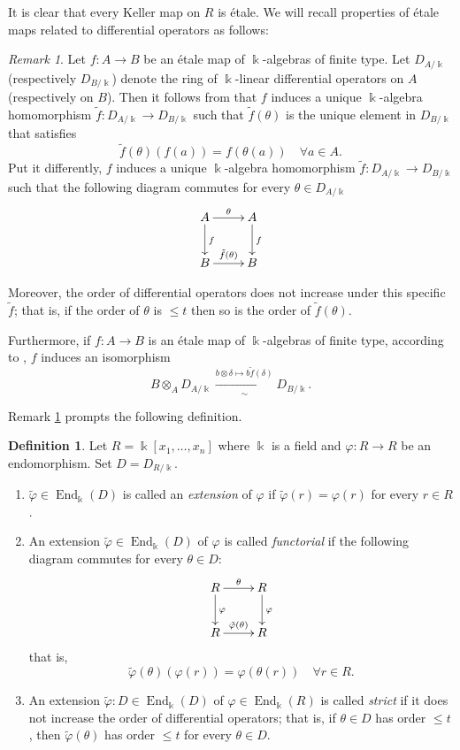 \documentclass[11pt]{amsart}
\theoremstyle{definition}
\newtheorem{definition}[theorem]{Definition}
\theoremstyle{remark}
\newtheorem{remark}[theorem]{Remark}
\numberwithin{equation}{subsection}
\DeclareMathOperator{\kk}{\Bbbk}
\DeclareMathOperator{\End}{End}
\begin{document}
It is clear that every Keller map on $R$ is \'{e}tale. We will recall  properties of \'{e}tale maps related to differential operators as follows:
\begin{remark}
\label{Masson theorem}
Let $f:A\to B$ be an \'{e}tale map of $\kk$-algebras of finite type. Let $D_{A/\kk}$ (respectively $D_{B/\kk}$) denote the ring of $\kk$-linear differential operators on $A$ (respectively on $B$). Then it follows from \cite[Theorem 2.2.5]{MassonThesis} that $f$ induces a unique $\kk$-algebra homomorphism $\tilde{f}:D_{A/\kk}\to D_{B/\kk}$ such that $\tilde{f}(\theta)$ is the unique element in $D_{B/\kk}$ that satisfies 
\[\tilde{f}(\theta)(f(a))=f(\theta(a))\quad\forall a\in A.\]
Put it differently, $f$ induces a unique $\kk$-algebra homomorphism $\tilde{f}:D_{A/\kk}\to D_{B/\kk}$ such that the following diagram commutes for every $\theta\in D_{A/\kk}$
\[
\xymatrix{
A \ar[r]^{\theta} \ar[d]^{f} & A \ar[d]^{f}\\
B\ar[r]^{\tilde{f}(\theta)} & B
}
\]
  
Moreover, the order of differential operators does not increase under this specific $\tilde{f}$; that is, if the order of $\theta$ is $\leq t$ then so is the order of $\tilde{f}(\theta)$.

Furthermore, if $f:A\to B$ is an \'{e}tale map of $\kk$-algebras of finite type, according to \cite[Theorem 2.2.10]{MassonThesis}, $f$ induces an isomorphism
\[B\otimes_AD_{A/\kk}\xrightarrow[\sim]{b\otimes \delta\mapsto b\tilde{f}(\delta)}D_{B/\kk}.\]
\end{remark}

Remark \ref{Masson theorem} prompts the following definition.
\begin{definition}
Let $R=\kk[x_1,\dots,x_n]$ where $\kk$ is a field and $\varphi:R\to R$ be an endomorphism. Set $D=D_{R/\kk}$.
\begin{enumerate}


\item $\tilde{\varphi}\in \End_{\kk}(D)$ is called an \emph{extension} of $\varphi$ if $\tilde{\varphi}(r)=\varphi(r)$ for every $r\in R$.

\item An extension $\tilde{\varphi}\in \End_{\kk}(D)$ of $\varphi$ is called \emph{functorial} if the following diagram commutes for every $\theta\in D$:
\[
\xymatrix{
R \ar[r]^{\theta} \ar[d]^{\varphi} & R \ar[d]^{\varphi}\\
R\ar[r]^{\tilde{\varphi}(\theta)} & R
}
\]
that is, 
\[\tilde{\varphi}(\theta)(\varphi(r))=\varphi(\theta(r))\quad\forall r\in R.\]
\item An extension $\tilde{\varphi}:D\in \End_{\kk}(D)$ of $\varphi\in \End_{\kk}(R)$ is called \emph{strict} if it does not increase the order of differential operators; that is, if $\theta\in D$ has order $\leq t$, then $\tilde{\varphi}(\theta)$ has order $\leq t$ for every $\theta\in D$.
\end{enumerate}
\end{definition}
\end{document}
